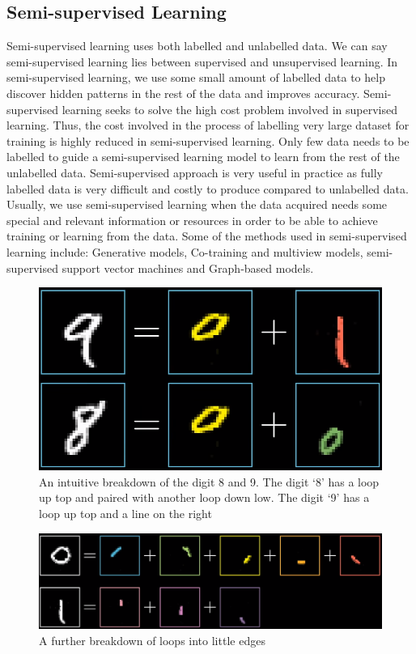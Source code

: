 \documentclass[master]{thesis-uestc}
\begin{document}
\subsection{Semi-supervised Learning}
Semi-supervised learning uses both labelled and unlabelled data. We can say semi-supervised learning lies between supervised and unsupervised learning. In semi-supervised learning, we use some small amount of labelled data to help discover hidden patterns in the rest of the data and improves accuracy. Semi-supervised learning seeks to solve the high cost problem involved in supervised learning. Thus, the cost involved in the process of labelling very large dataset for training is highly reduced in semi-supervised learning. Only few data needs to be labelled to guide a semi-supervised learning model to learn from the rest of the unlabelled data. Semi-supervised approach is very useful in practice as fully labelled data is very difficult and costly to produce compared to unlabelled data. Usually, we use semi-supervised learning when the data acquired needs some special and relevant information or resources in order to be able to achieve training or learning from the data. Some of the methods used in semi-supervised learning include: Generative models, Co-training and multiview models, semi-supervised support vector machines and Graph-based models.

\begin{figure}[ht]
\includegraphics[width=5in]{pic/digits.PNG}
\caption{An intuitive breakdown of the digit 8 and 9. The digit `8' has a loop up top and paired with another loop down low. The digit `9' has a loop up top and a line on the right}
\label{fig_digit}
\end{figure}
\begin{figure}[ht]
\includegraphics[width=5in]{pic/digits_subcomponents.PNG}
\caption{A further breakdown of loops into little edges}
\label{fig_digit_sub}
\end{figure}
\end{document}
